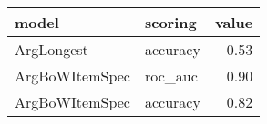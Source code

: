 \begin{tabular}{llr}
\toprule
          model &   scoring &  value \\
\midrule
     ArgLongest &  accuracy &   0.53 \\
 ArgBoWItemSpec &   roc\_auc &   0.90 \\
 ArgBoWItemSpec &  accuracy &   0.82 \\
\bottomrule
\end{tabular}
